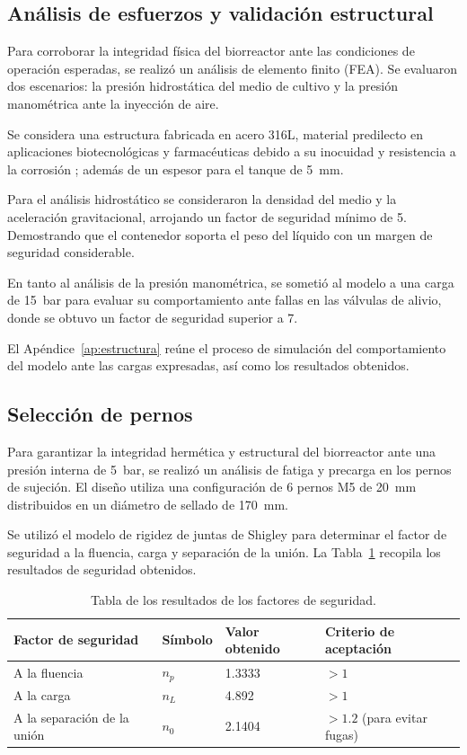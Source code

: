 \documentclass[11pt,tesis,twoside,openright,spanish]{upiiztt}
\begin{document}
\subsection{Análisis de esfuerzos y validación estructural}

Para corroborar la integridad física del biorreactor ante las condiciones de
operación esperadas, se realizó un análisis de elemento finito (FEA). Se evaluaron
dos escenarios: la presión hidrostática del medio de cultivo y la presión
manométrica ante la inyección de aire.

Se considera una estructura fabricada en acero 316L, material predilecto en
aplicaciones biotecnológicas y farmacéuticas debido a su inocuidad y resistencia a
la corrosión \cite{Serviacero}; además de un espesor para el tanque de 5~mm.

Para el análisis hidrostático se consideraron la densidad del medio y la aceleración
gravitacional, arrojando un factor de seguridad mínimo de 5. Demostrando que el
contenedor soporta el peso del líquido con un margen de seguridad considerable.

En tanto al análisis de la presión manométrica, se sometió al modelo a una carga
de 15~bar para evaluar su comportamiento ante fallas en las válvulas de alivio,
donde se obtuvo un factor de seguridad superior a 7.

El Apéndice~\ref{ap:estructura} reúne el proceso de simulación del comportamiento del modelo ante
las cargas expresadas, así como los resultados obtenidos.

\subsection{Selección de pernos}

Para garantizar la integridad hermética y estructural del biorreactor ante una
presión interna de 5~bar, se realizó un análisis de fatiga y precarga en los pernos
de sujeción. El diseño utiliza una configuración de 6 pernos M5 de 20~mm
distribuidos en un diámetro de sellado de 170~mm.

Se utilizó el modelo de rigidez de juntas de Shigley para determinar el factor de
seguridad a la fluencia, carga y separación de la unión. La Tabla~\ref{tab:factores_seguridad} recopila los
resultados de seguridad obtenidos.

\begin{table}[H]
\centering
\caption{Tabla de los resultados de los factores de seguridad.}
\label{tab:factores_seguridad}
\begin{tabular}{llll}
\toprule
\textbf{Factor de seguridad} & \textbf{Símbolo} & \textbf{Valor obtenido} & \textbf{Criterio de aceptación} \\
\midrule
A la fluencia        & $n_p$ & 1.3333 & $> 1$ \\
A la carga           & $n_L$ & 4.892  & $> 1$ \\
A la separación de la unión & $n_0$ & 2.1404 & $> 1.2$ (para evitar fugas) \\
\bottomrule
\end{tabular}
\end{table}
\end{document}
